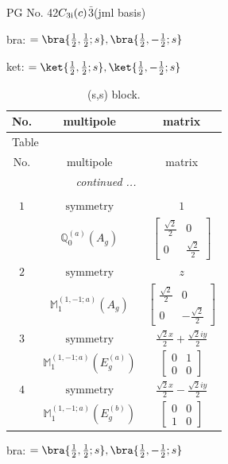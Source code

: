 \documentclass[fleqn,8pt,landscape]{jsarticle}
\begin{document}
\setcounter{MaxMatrixCols}{32}

\renewcommand{\tablename}{Table~}
\renewcommand{\figurename}{Figure~}
\begin{center}
\LARGE
PG No. 42\quad$C_{\rm 3i}(c)$\quad$\bar{3}$\quad[ trigonal ] (jml basis)
\end{center}
bra: $=\bra{\frac{1}{2},\frac{1}{2};s}, \bra{\frac{1}{2},- \frac{1}{2};s}$

\noindent
ket: $=\ket{\frac{1}{2},\frac{1}{2};s}, \ket{\frac{1}{2},- \frac{1}{2};s}$
\renewcommand{\arraystretch}{1.6}
\begin{longtable}{ccc}
\caption{(s,s) block.}
 \\
 \hline \hline
No. & multipole & matrix \\ \hline \endfirsthead

\multicolumn{2}{l}{\tablename\ \thetable{}} \\
 \hline \hline
No. & multipole & matrix \\ \hline \endhead

 \hline \hline
\multicolumn{2}{r}{\footnotesize\it continued ...} \\ \endfoot

 \hline \hline
\multicolumn{2}{r}{} \\ \endlastfoot

$ 1 $ & $ \text{symmetry} $ & $ 1 $ \\
$  $ & $ \mathbb{Q}_{0}^{(a)}(A_{g}) $ & $ \begin{bmatrix} \frac{\sqrt{2}}{2} & 0 \\ 0 & \frac{\sqrt{2}}{2} \end{bmatrix} $ \\ \hline
$ 2 $ & $ \text{symmetry} $ & $ z $ \\
$  $ & $ \mathbb{M}_{1}^{(1,-1;a)}(A_{g}) $ & $ \begin{bmatrix} \frac{\sqrt{2}}{2} & 0 \\ 0 & - \frac{\sqrt{2}}{2} \end{bmatrix} $ \\ \hline
$ 3 $ & $ \text{symmetry} $ & $ \frac{\sqrt{2} x}{2} + \frac{\sqrt{2} i y}{2} $ \\
$  $ & $ \mathbb{M}_{1}^{(1,-1;a)}(E_{g}^{(a)}) $ & $ \begin{bmatrix} 0 & 1 \\ 0 & 0 \end{bmatrix} $ \\ \hline
$ 4 $ & $ \text{symmetry} $ & $ \frac{\sqrt{2} x}{2} - \frac{\sqrt{2} i y}{2} $ \\
$  $ & $ \mathbb{M}_{1}^{(1,-1;a)}(E_{g}^{(b)}) $ & $ \begin{bmatrix} 0 & 0 \\ 1 & 0 \end{bmatrix} $ \\ \hline
\end{longtable}
bra: $=\bra{\frac{1}{2},\frac{1}{2};s}, \bra{\frac{1}{2},- \frac{1}{2};s}$
\end{document}
